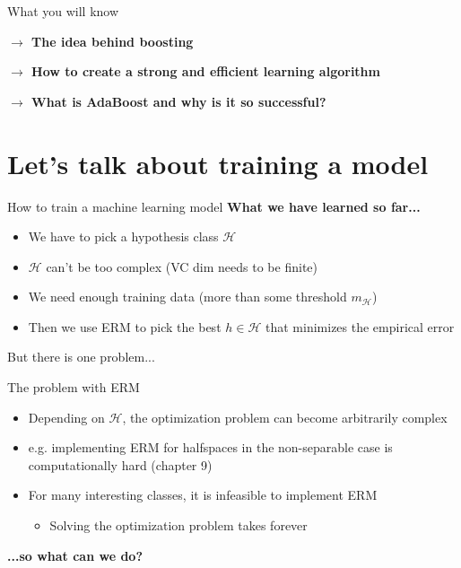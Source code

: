 \begin{frame}{What you will know} \pause

    \textbf{$\rightarrow$ The idea behind boosting}
    
    \vspace{0.8cm}
    
    \pause

    \textbf{$\rightarrow$ How to create a strong and efficient learning algorithm}

    \vspace{0.8cm}
    
    \pause

    \textbf{$\rightarrow$ What is AdaBoost and why is it so successful?}
\end{frame}

\section{Let's talk about training a model}

\begin{frame}{How to train a machine learning model}
    \textbf{What we have learned so far...} \pause
    \begin{itemize}
        \item We have to pick a hypothesis class $\mathcal{H}$ \pause
        \item $\mathcal{H}$ can't be too complex (VC dim needs to be finite) \pause
        \item We need enough training data (more than some threshold $m_\mathcal{H}$) \pause
        \item Then we use ERM to pick the best $h \in \mathcal{H}$ that minimizes the empirical error \pause
    \end{itemize}
    But there is one problem...
\end{frame}

\begin{frame}{The problem with ERM}
\setlength{\fboxrule}{2pt}
    \begin{center}
    \end{center}

    \pause    
    
    \begin{itemize}
        \item Depending on $\mathcal{H}$, the optimization problem can become arbitrarily complex \pause
        \item e.g. implementing ERM for halfspaces in the non-separable case is computationally hard (chapter 9) \pause
        \item For many interesting classes, it is infeasible to implement ERM
        \begin{itemize}
            \item Solving the optimization problem takes forever
        \end{itemize}
    \end{itemize}

    \pause    
    
    \textbf{...so what can we do?}
\end{frame}

